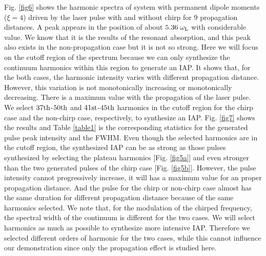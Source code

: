 \documentclass[10pt,letterpaper]{article}
\begin{document}
Fig. \ref{fig6} shows the harmonic spectra of system with permanent dipole moments ($ \xi=4 $) driven by the laser pulse with and without chirp for 9 propagation distances. A peak appears in the position of about  $ 5.36\;\omega_{\rm{L}} $ with considerable value. We know that it is the results of the resonant absorption, and this peak also exists in the non-propagation case but it is not so strong. Here we will focus on the cutoff region of the spectrum because we can only synthesize the continuum harmonics within this region to generate an IAP. It shows that, for the both cases, the harmonic intensity varies with different propagation distance. However, this variation is not monotonically increasing or monotonically decreasing. There is a maximum value with the propagation of the laser pulse. We select $37\rm{th}$-$50\rm{th}$ and $41\rm{st}$-$45\rm{th}$ harmonics in the cutoff region for the chirp case and the non-chirp case, respectively, to synthesize an IAP. Fig. \ref{fig7} shows the results and Table \ref{table1} is the corresponding statistics for the generated pulse peak intensity and the FWHM. Even though the selected harmonics are in the cutoff region, the synthesized IAP can be as strong as those pulses synthesized by selecting the plateau harmonics [Fig. \ref{fig5a}] and even stronger than the two generated pulses of the chirp case [Fig. \ref{fig5b}]. However, the pulse intensity cannot progressively increase, it will has a maximum value for an proper propagation distance. And the pulse for the chirp or non-chirp case almost has the same duration for different propagation distance because of the same harmonics selected. We note that, for the modulation of the chirped frequency, the spectral width of the continuum is different for the two cases. We will select harmonics as much as possible to synthesize more intensive IAP. Therefore we selected different orders of harmonic for the two cases, while this cannot influence our demonstration  since only the propagation effect is studied here.
\end{document}
